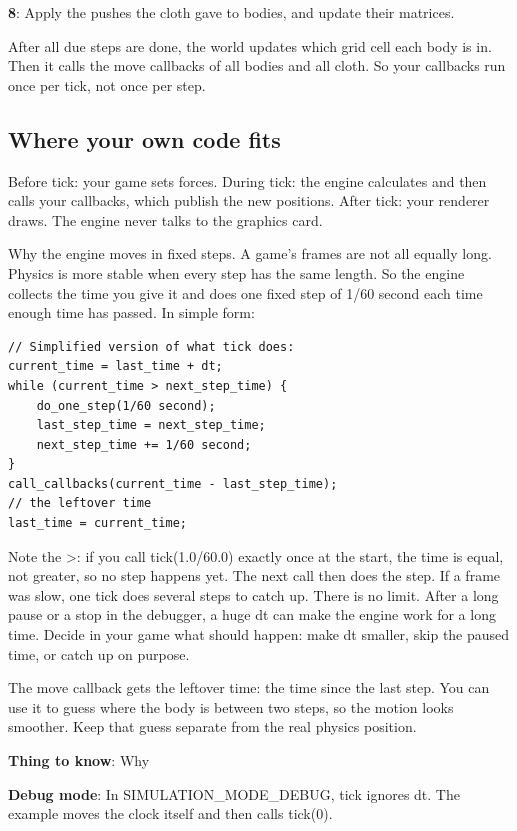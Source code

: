 \documentclass[11pt,a4paper]{article}
\begin{document}
\textbf{8}: Apply the pushes the cloth gave to bodies, and update their matrices.

After all due steps are done, the world updates which grid cell each body is in. Then it calls the move callbacks of all bodies and all cloth. So your callbacks run once per tick, not once per step.

\subsection*{Where your own code fits}
Before tick: your game sets forces. During tick: the engine calculates and then calls your callbacks, which publish the new positions. After tick: your renderer draws. The engine never talks to the graphics card.

\label{vpe-core-11}
Why the engine moves in fixed steps. A game's frames are not all equally long. Physics is more stable when every step has the same length. So the engine collects the time you give it and does one fixed step of 1/60 second each time enough time has passed. In simple form:

\begin{lstlisting}
// Simplified version of what tick does:
current_time = last_time + dt;
while (current_time > next_step_time) {
    do_one_step(1/60 second);
    last_step_time = next_step_time;
    next_step_time += 1/60 second;
}
call_callbacks(current_time - last_step_time);                       // the leftover time
last_time = current_time;
\end{lstlisting}

Note the >: if you call tick(1.0/60.0) exactly once at the start, the time is equal, not greater, so no step happens yet. The next call then does the step. If a frame was slow, one tick does several steps to catch up. There is no limit. After a long pause or a stop in the debugger, a huge dt can make the engine work for a long time. Decide in your game what should happen: make dt smaller, skip the paused time, or catch up on purpose.

The move callback gets the leftover time: the time since the last step. You can use it to guess where the body is between two steps, so the motion looks smoother. Keep that guess separate from the real physics position.

\textbf{Thing to know}: Why

\textbf{Debug mode}: In SIMULATION\_MODE\_DEBUG, tick ignores dt. The example moves the clock itself and then calls tick(0).
\end{document}
